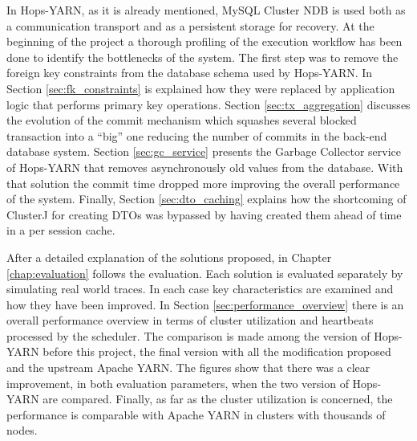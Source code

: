 In Hops-YARN, as it is already mentioned, MySQL Cluster NDB is used
both as a communication transport and as a persistent storage for
recovery. At the beginning of the project a thorough profiling of the
execution workflow has been done to identify the bottlenecks of the
system. The first step was to remove the foreign key constraints from
the database schema used by Hops-YARN. In Section
\ref{sec:fk_constraints} is explained how they were replaced by
application logic that performs primary key operations. Section
\ref{sec:tx_aggregation} discusses the evolution of the commit
mechanism which squashes several blocked transaction into a ``big''
one reducing the number of commits in the back-end database
system. Section \ref{sec:gc_service} presents the Garbage Collector
service of Hops-YARN that removes asynchronously old values from the
database. With that solution the commit time dropped more improving
the overall performance of the system. Finally, Section
\ref{sec:dto_caching} explains how the shortcoming of ClusterJ for
creating DTOs was bypassed by having created them ahead of time in a
per session cache.

After a detailed explanation of the solutions proposed, in Chapter
\ref{chap:evaluation} follows the evaluation. Each solution is
evaluated separately by simulating real world traces. In each case key
characteristics are examined and how they have been improved. In
Section \ref{sec:performance_overview} there is an overall performance
overview in terms of cluster utilization and heartbeats processed by
the scheduler. The comparison is made among the version of Hops-YARN
before this project, the final version with all the modification
proposed and the upstream Apache YARN. The figures show that there was
a clear improvement, in both evaluation parameters, when the two
version of Hops-YARN are compared. Finally, as far as the cluster
utilization is concerned, the performance is comparable with Apache
YARN in clusters with thousands of nodes.